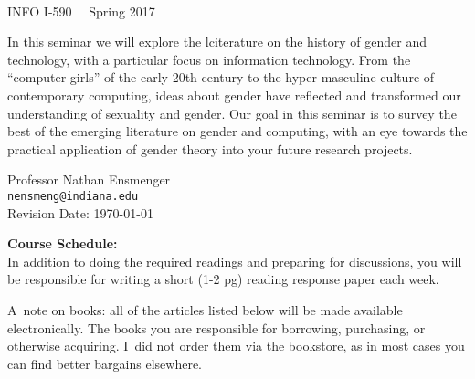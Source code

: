\documentclass[11pt]{article}
\begin{document}
\thispagestyle{empty}
	
\begin{center}	
	
  \fontsize{28pt}{32pt} \selectfont {Technology \& Gender} \\
  \Large{INFO I-590 \textbullet \ \ Spring 2017}\\

\vspace{0.2in}

\setlength{\fboxsep}{0mm} %
\setlength{\fboxrule}{2pt}

\end{center}
 
\vspace{0.2in}

In this seminar we will explore the lciterature on the history of gender and technology, with a particular focus on information technology.  From the ``computer girls'' of the early 20th century to the hyper-masculine culture of contemporary computing, ideas about gender have reflected and transformed our understanding of sexuality and gender.  Our goal in this seminar is to survey the best of the emerging literature on gender and computing, with an eye towards the practical application of gender theory into your future research projects.


\vspace{0.1in}

\begin{center} 
 Professor Nathan Ensmenger\\ \texttt{nensmeng@indiana.edu}\\
\vspace{0.1in}
Revision Date: \today
\end{center}

\vspace{0.3in}

\newpage


\newpage
\large{\textbf{Course Schedule:}}\\


\noindent In addition to doing the required readings and preparing for discussions, you will be responsible for writing a short (1-2 pg) reading response paper each week.

\noindent A~note on books: all of the articles listed below will be made available electronically.  The books you are responsible for borrowing, purchasing, or otherwise acquiring.  I~did not order them via the bookstore, as in most cases you can find better bargains elsewhere.
\end{document}
